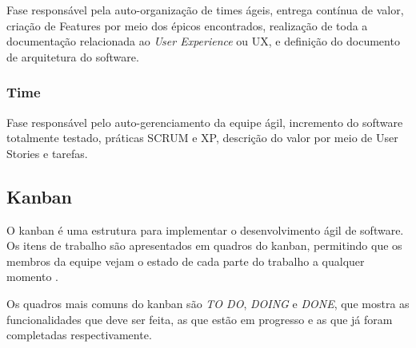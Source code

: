 Fase responsável pela auto-organização de times ágeis, entrega contínua de valor, criação de Features por meio dos épicos encontrados, realização de toda a documentação relacionada ao \textit{User Experience} ou UX, e definição do documento de arquitetura do software.

\subsubsection{Time}

Fase responsável pelo auto-gerenciamento da equipe ágil, incremento do software totalmente testado, práticas SCRUM e XP, descrição do valor por meio de User Stories e tarefas.

\subsection{Kanban}

O kanban é uma estrutura para implementar o desenvolvimento ágil de software. Os itens de trabalho são apresentados em
quadros do kanban, permitindo que os membros da equipe vejam o estado de cada parte do trabalho a qualquer momento
\cite{dan}.

Os quadros mais comuns do kanban são \textit{TO DO}, \textit{DOING} e \textit{DONE}, que mostra as funcionalidades que deve ser feita, as que estão em progresso e as que já foram completadas respectivamente.
